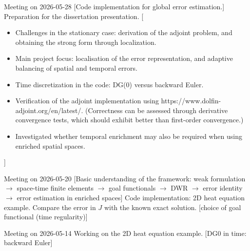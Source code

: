 \documentclass[11pt,a4paper]{article}
\begin{document}
\meet
{Meeting on 2026-05-28}
[Code implementation for global error estimation.]
{Preparation for the dissertation presentation.}
[\begin{itemize}
    \item Challenges in the stationary case: derivation of the adjoint problem, and obtaining the strong form through localization.
    \item Main project focus: localisation of the error representation, and adaptive balancing of spatial and temporal errors.
    \item Time discretization in the code: DG(0) versus backward Euler.
    \item Verification of the adjoint implementation using https://www.dolfin-adjoint.org/en/latest/. (Correctness can be assessed through derivative convergence tests, which should exhibit better than first-order convergence.)
    \item Investigated whether temporal enrichment may also be required when using enriched spatial spaces.
\end{itemize}
]
\vspace{1.5em}



\meet
{Meeting on 2026-05-20}
[Basic understanding of the framework: 
weak formulation $\rightarrow$ space-time finite elements $\rightarrow$ goal functionals $\rightarrow$ DWR $\rightarrow$ error identity $\rightarrow$ error estimation in enriched spaces]
{Code implementation: 2D heat equation example.
Compare the error in $J$ with the known exact solution.}
[choice of goal functional (time regularity)]
\vspace{1.5em}



\meet
{Meeting on 2026-05-14}
{Working on the 2D heat equation example.
}
[DG0 in time: backward Euler]
\end{document}
